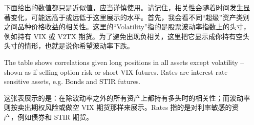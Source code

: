 \begin{chineseblock}下面给出的数值都只是近似值，应当谨慎使用。请记住，相关性会随着时间发生显著变化，可能远高于或远低于这里展示的水平。首先，我会看不同“超级”资产类别之间品种价格收益的相关性。这里的“Volatility”指的是股票波动率指数上的头寸，例如持有 VIX 或 V2TX 期货。为了避免出现负相关，这里把它显示成你持有空头头寸的情形，也就是说你希望波动率下跌。\end{chineseblock}

\begin{bilingualtableblock} 
\end{bilingualtableblock}

\begin{englishblock} The table shows correlations given long positions in all assets except volatility -- shown as if selling option risk or short VIX futures. Rates are interest rate sensitive assets, e.g. Bonds and STIR futures. \end{englishblock}

\begin{chineseblock}这张表展示的是：在除波动率之外的所有资产上都持有多头时的相关性；而波动率则按卖出期权风险或做空 VIX 期货那样来展示。Rates 指的是对利率敏感的资产，例如债券和 STIR 期货。\end{chineseblock}

